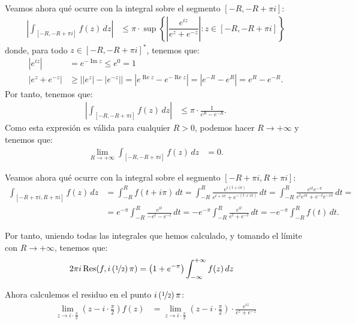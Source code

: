\documentclass[12pt]{article}
\renewcommand{\Re}{\operatorname{Re}} %
\renewcommand{\Im}{\operatorname{Im}}
\DeclareMathOperator{\Res}{Res}
\begin{document}
\begin{ejercicio}[2.5 puntos]
    Veamos ahora qué ocurre con la integral sobre el segmento $[-R, -R + \pi i]$:
    \begin{align*}
        \left|\int_{[-R, -R + \pi i]} f(z) \, dz\right| &\leq \pi\cdot \sup\left\{\left|\dfrac{e^{iz}}{e^z + e^{-z}}\right| : z\in [-R, -R + \pi i]\right\}
    \end{align*}
    donde, para todo $z\in [-R, -R + \pi i]^*$, tenemos que:
    \begin{align*}
        |e^{iz}| &= e^{-\Im z}\leq e^0=1\\
        |e^z + e^{-z}| &\geq \left||e^z| - |e^{-z}|\right| = \left|e^{\Re z} - e^{-\Re z}\right| = \left|e^{-R} - e^{R}\right| = e^{R} - e^{-R}.
    \end{align*}
    Por tanto, tenemos que:
    \begin{align*}
        \left|\int_{[-R, -R + \pi i]} f(z) \, dz\right| &\leq \pi\cdot \frac{1}{e^{R} - e^{-R}}.
    \end{align*}
    Como esta expresión es válida para cualquier $R > 0$, podemos hacer $R \to +\infty$ y tenemos que:
    \begin{align*}
        \lim_{R\to+\infty} \int_{[-R, -R + \pi i]} f(z) \, dz &= 0.
    \end{align*}




    Veamos ahora qué ocurre con la integral sobre el segmento $[-R + \pi i, R + \pi i]$:
    \begin{align*}
        \int_{[-R + \pi i, R + \pi i]} f(z) \, dz &= \int_{-R}^{R} f(t + i\pi) \, dt
        = \int_{-R}^{R} \frac{e^{i(t + i\pi)}}{e^{t + i\pi} + e^{-(t + i\pi)}} \, dt
        = \int_{-R}^{R} \frac{e^{it}e^{-\pi}}{e^{t}e^{i\pi} + e^{-t}e^{-i\pi}} \, dt
        =\\&= e^{-\pi}\int_{-R}^{R} \frac{e^{it}}{- e^t - e^{-t}} \, dt
        = -e^{-\pi}\int_{-R}^{R} \frac{e^{it}}{e^t + e^{-t}} \, dt
        = -e^{-\pi}\int_{-R}^{R} f(t) \, dt.
    \end{align*}

    Por tanto, uniendo todas las integrales que hemos calculado, y tomando el límite con $R\to +\infty$, tenemos que:
    \begin{align*}
        2\pi i\Res(f, i\left(\nicefrac{1}{2}\right)\pi) &= \left(1+e^{-\pi}\right)\int_{-\infty}^{+\infty} f(z) \, dz
    \end{align*}

    Ahora calculemos el residuo en el punto $i\left(\nicefrac{1}{2}\right)\pi$:
    \begin{align*}
        \lim_{z\to i\cdot \frac{\pi}{2}} \left(z - i\cdot \frac{\pi}{2}\right)f(z) &= \lim_{z\to i\cdot \frac{\pi}{2}} \left(z - i\cdot \frac{\pi}{2}\right)\cdot \frac{e^{iz}}{e^z + e^{-z}}
    \end{align*}


\end{ejercicio}
\end{document}

